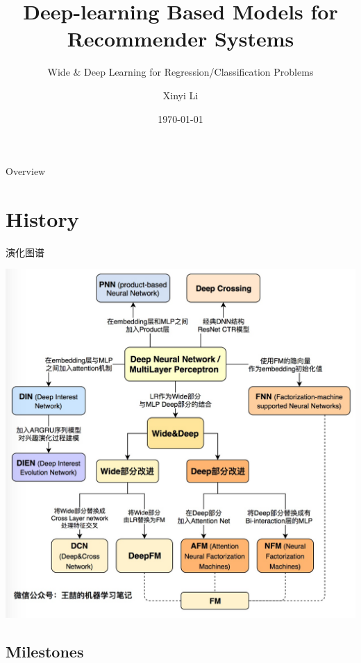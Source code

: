 \documentclass{ctexbeamer}
\title{Deep-learning Based Models for Recommender Systems}
\subtitle{Wide \& Deep Learning for Regression/Classification Problems}
\author{Xinyi Li}
\date{\today}
\begin{document}
\begin{frame}
	\titlepage
\end{frame}

\begin{frame}{Overview}
	\tableofcontents
\end{frame}

\section{History}
\begin{frame}{演化图谱}
	\begin{center}
	\includegraphics[width=.7\textwidth]{history}
\end{center}
\end{frame}

\subsection{Milestones}
\end{document}
